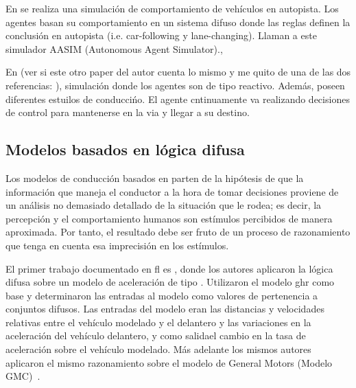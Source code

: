 En \cite{Das} se realiza una simulación de comportamiento de vehículos en autopista. Los agentes basan su comportamiento en un sistema difuso donde las reglas definen la conclusión en autopista (i.e. car-following y lane-changing). Llaman a este simulador AASIM (Autonomous Agent Simulator).,

En \cite{Ehlert2001} (ver si este otro paper del autor cuenta lo mismo y me quito de una de las dos referencias: \cite{Ehlert2001-2}), simulación donde los agentes son de tipo reactivo. Además, poseen diferentes estuilos de conduccińo. El agente cntinuamente va realizando decisiones de control para mantenerse en la via y llegar a su destino.


\subsection{Modelos basados en lógica difusa}

Los modelos de conducción basados en  parten de la hipótesis de que la información que maneja el conductor a la hora de tomar decisiones proviene de un análisis no demasiado detallado de la situación que le rodea; es decir, la percepción y el comportamiento humanos son estímulos percibidos de manera aproximada. Por tanto, el resultado debe ser fruto de un proceso de razonamiento que tenga en cuenta esa imprecisión en los estímulos.

El primer trabajo documentado en \gls{fl} es \cite{Kikuchi1992}, donde los autores aplicaron la lógica difusa sobre un modelo de aceleración de tipo \textit{}. Utilizaron el modelo \gls{ghr} como base y determinaron las entradas al modelo como valores de pertenencia a conjuntos difusos. Las entradas del modelo eran las distancias y velocidades relativas entre el vehículo modelado y el delantero y las variaciones en la aceleración del vehículo delantero, y como salidael cambio en la tasa de aceleración sobre el vehículo modelado. Más adelante los mismos autores aplicaron el mismo razonamiento sobre el modelo de General Motors (Modelo GMC)~\cite{Chakroborty1999}.


